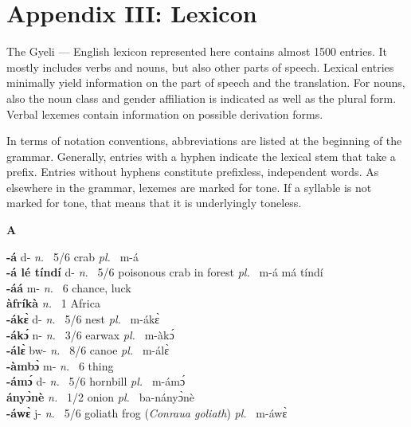 \chapter*{Appendix III: Lexicon} 
\label{sec:AppendixIII}


The Gyeli --- English lexicon represented here contains almost 1500 entries. It mostly includes verbs and nouns, but also other parts of speech. Lexical entries minimally yield information on the part of speech and the translation. For nouns, also the noun class and gender affiliation is indicated as well as the plural form. Verbal lexemes contain information on possible derivation forms.

In terms of notation conventions, abbreviations are listed at the beginning of the grammar. Generally, entries with a hyphen indicate the lexical stem that take a prefix. Entries without hyphens constitute prefixless, independent words.
As elsewhere in the grammar, lexemes are marked for tone. If a syllable is not marked for tone, that means that it is underlyingly toneless.

\twocolumn
\setlength{\columnsep}{.3cm}
\sloppy





\noindent \large {\bfseries A}\normalsize\\
\medskip

\noindent
{\bfseries -á} d- {\itshape n.~} 5/6 crab {\itshape pl.~} m-á    \\ 
{\bfseries -á lé tíndí} d- {\itshape n.~} 5/6 poisonous crab in forest  {\itshape pl.~} m-á má tíndí  \\ 
{\bfseries -áá} m- {\itshape n.~} 6 chance, luck    \\ 
{\bfseries  àfríkà}  {\itshape n.~} 1 Africa    \\ 
{\bfseries -ákɛ̀} d- {\itshape n.~} 5/6 nest {\itshape pl.~} m-ákɛ̀    \\ 
{\bfseries -ákɔ́} n- {\itshape n.~} 3/6 earwax {\itshape pl.~} m-àkɔ́    \\ 
{\bfseries -álɛ̀ } bw- {\itshape n.~} 8/6 canoe {\itshape pl.~} m-álɛ̀    \\ 
{\bfseries -àmbɔ̀} m- {\itshape n.~} 6 thing    \\ 
{\bfseries -ámɔ́} d- {\itshape n.~} 5/6 hornbill {\itshape pl.~} m-ámɔ́   \\ 
{\bfseries  ányɔ̀nè}  {\itshape n.~} 1/2  onion {\itshape pl.~} ba-nányɔ̀nè    \\ 
{\bfseries -áwɛ̀} j- {\itshape n.~} 5/6 goliath frog ({\itshape Conraua goliath}) {\itshape pl.~} m-áwɛ̀    \\ 

